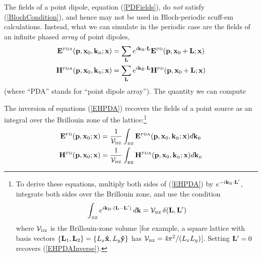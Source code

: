 \documentclass[letterpaper]{article}
\begin{document}
The fields of a point dipole, equation (\ref{PDFields}), do \textit{not}
satisfy (\ref{BlochCondition}), and hence may not be used in
Bloch-periodic {\sc scuff-em} calculations. Instead, what we can 
simulate in the periodic case are the fields of an infinite
phased \textit{array} of point dipoles,
\begin{subequations}
\begin{align*}
 \mathbf{E}^{\hbox{\tiny{PDA}}}(\mathbf{p}, \mathbf{x}_0, \mathbf{k}_{\hbox{\tiny{B}}}; \mathbf{x})
&=\sum_{\mathbf{L}} e^{i\mathbf{k}_{\hbox{\tiny{B}}}\cdot \mathbf{L}}
  \mathbf{E}^{\hbox{\tiny{PD}}}(\mathbf{p}, \mathbf{x}_0 + \mathbf{L}; \mathbf{x})
\\
 \mathbf{H}^{\hbox{\tiny{PDA}}}(\mathbf{p}, \mathbf{x}_0, \mathbf{k}_{\hbox{\tiny{B}}}; \mathbf{x})
&=\sum_{\mathbf{L}} e^{i\mathbf{k}_{\hbox{\tiny{B}}} \cdot \mathbf{L}}
  \mathbf{H}^{\hbox{\tiny{PD}}}(\mathbf{p}, \mathbf{x}_0  + \mathbf{L}; \mathbf{x})
\end{align*}
\label{EHPDA}
\end{subequations}
(where ``PDA'' stands for ``point dipole array''). The quantity
we can compute

The inversion of equations (\ref{EHPDA}) recovers the fields
of a point source as an integral over the Brillouin zone of the 
lattice:\footnote{To derive these equations, multiply both sides
of (\ref{EHPDA}) by $e^{-i\mathbf{k}_{\hbox{\tiny{B}}} \cdot \mathbf{L}^\prime}$,
integrate both sides over the Brillouin zone, and use the
condition 
$$\int_{\hbox{\tiny{BZ}}} e^{i\mathbf{k}_{\hbox{\tiny{B}}}\cdot (\mathbf{L}-\mathbf{L}^\prime)}\,d\mathbf{k}
  =\mathcal{V}_{\hbox{\tiny{BZ}}} \, \delta(\mathbf{L},\mathbf{L}^\prime)
$$
where $\mathcal{V}_{\hbox{\tiny{BZ}}}$ is the Brillouin-zone volume [for example,
a square lattice with basis vectors
$\{\mathbf{L}_1, \mathbf{L}_2\}=\{L_x\mathbf{\hat x}, L_y\mathbf{\hat y}\}$ has
$\mathcal{V}_{\hbox{\tiny{BZ}}}=4\pi^2/(L_x L_y)$].
Setting $\mathbf{L}^\prime=0$ recovers (\ref{EHPDAInverse}).}
\begin{subequations}
\begin{align}
  \mathbf{E}^{\hbox{\tiny{PD}}}(\mathbf{p}, \mathbf{x}_0; \mathbf{x})
&=\frac{1}{\mathcal{V}_{\hbox{\tiny{BZ}}}} 
   \int_{\hbox{\tiny{BZ}}} \mathbf{E}^{\hbox{\tiny{PDA}}}(\mathbf{p}, \mathbf{x}_0, \mathbf{k}_{\hbox{\tiny{B}}}; \mathbf{x}) 
   d\mathbf{k}_{\hbox{\tiny{B}}}
\\
  \mathbf{H}^{\hbox{\tiny{PD}}}(\mathbf{p}, \mathbf{x}_0; \mathbf{x})
&=\frac{1}{\mathcal{V}_{\hbox{\tiny{BZ}}}} 
   \int_{\hbox{\tiny{BZ}}} \mathbf{H}^{\hbox{\tiny{PDA}}}(\mathbf{p}, \mathbf{x}_0, \mathbf{k}_{\hbox{\tiny{B}}}; \mathbf{x}) 
   d\mathbf{k}_{\hbox{\tiny{B}}}
\end{align}
\label{EHPDAInverse}
\end{subequations}
\end{document}
